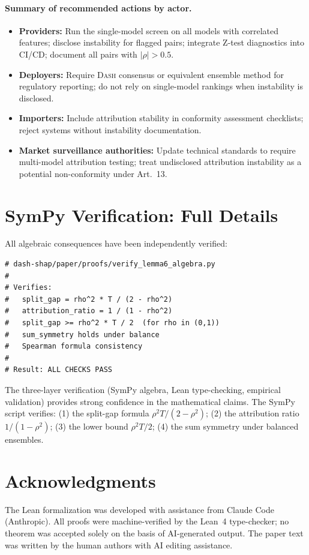 \documentclass{article}
\newcommand{\DASH}{\textsc{Dash}}
\begin{document}
\paragraph{Summary of recommended actions by actor.}
\begin{itemize}
    \item \textbf{Providers:} Run the single-model screen on all models with correlated features; disclose instability for flagged pairs; integrate Z-test diagnostics into CI/CD; document all pairs with $|\rho| > 0.5$.
    \item \textbf{Deployers:} Require \DASH{} consensus or equivalent ensemble method for regulatory reporting; do not rely on single-model rankings when instability is disclosed.
    \item \textbf{Importers:} Include attribution stability in conformity assessment checklists; reject systems without instability documentation.
    \item \textbf{Market surveillance authorities:} Update technical standards to require multi-model attribution testing; treat undisclosed attribution instability as a potential non-conformity under Art.~13.
\end{itemize}

\section{SymPy Verification: Full Details}

All algebraic consequences have been independently verified:

\begin{verbatim}
# dash-shap/paper/proofs/verify_lemma6_algebra.py
#
# Verifies:
#   split_gap = rho^2 * T / (2 - rho^2)
#   attribution_ratio = 1 / (1 - rho^2)
#   split_gap >= rho^2 * T / 2  (for rho in (0,1))
#   sum_symmetry holds under balance
#   Spearman formula consistency
#
# Result: ALL CHECKS PASS
\end{verbatim}

The three-layer verification (SymPy algebra, Lean type-checking, empirical validation) provides strong confidence in the mathematical claims. The SymPy script verifies: (1) the split-gap formula $\rho^2 T/(2-\rho^2)$; (2) the attribution ratio $1/(1-\rho^2)$; (3) the lower bound $\rho^2 T/2$; (4) the sum symmetry under balanced ensembles.

\section*{Acknowledgments}
The Lean formalization was developed with assistance from Claude Code (Anthropic). All proofs were machine-verified by the Lean~4 type-checker; no theorem was accepted solely on the basis of AI-generated output. The paper text was written by the human authors with AI editing assistance.



\end{document}
